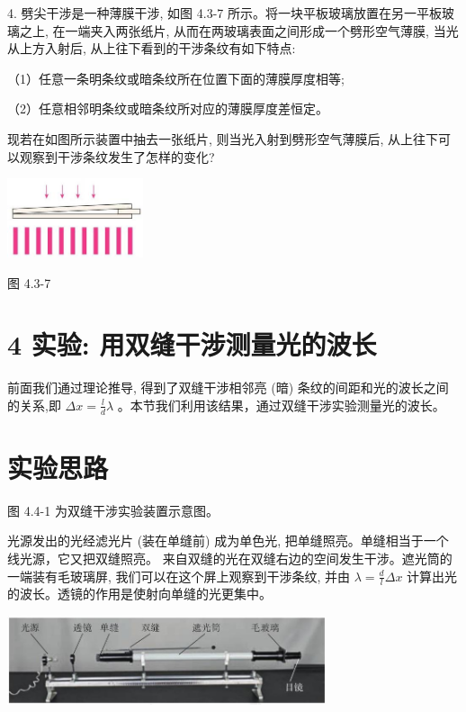 \documentclass[10pt]{article}
\begin{document}
4. 劈尖干涉是一种薄膜干涉, 如图 4.3-7 所示。将一块平板玻璃放置在另一平板玻璃之上, 在一端夹入两张纸片, 从而在两玻璃表面之间形成一个劈形空气薄膜, 当光从上方入射后, 从上往下看到的干涉条纹有如下特点:

（1）任意一条明条纹或暗条纹所在位置下面的薄膜厚度相等;

（2）任意相邻明条纹或暗条纹所对应的薄膜厚度差恒定。

现若在如图所示装置中抽去一张纸片, 则当光入射到劈形空气薄膜后, 从上往下可以观察到干涉条纹发生了怎样的变化?

\begin{center}
\includegraphics[max width=0.3\textwidth]{images/01910e4c-ebb8-7d2c-8f2f-2375bc1d2d12_105_471367.jpg}
\end{center}

图 4.3-7

\section*{4 实验: 用双缝干涉测量光的波长}

前面我们通过理论推导, 得到了双缝干涉相邻亮 (暗) 条纹的间距和光的波长之间的关系,即 \({\Delta x} = \frac{l}{d}\lambda\) 。本节我们利用该结果，通过双缝干涉实验测量光的波长。

\section*{实验思路}

图 4.4-1 为双缝干涉实验装置示意图。

光源发出的光经滤光片 (装在单缝前) 成为单色光, 把单缝照亮。单缝相当于一个线光源，它又把双缝照亮。 来自双缝的光在双缝右边的空间发生干涉。遮光筒的一端装有毛玻璃屏, 我们可以在这个屏上观察到干涉条纹, 并由 \(\lambda = \frac{d}{l}{\Delta x}\) 计算出光的波长。透镜的作用是使射向单缝的光更集中。

\begin{center}
\includegraphics[max width=0.7\textwidth]{images/01910e4c-ebb8-7d2c-8f2f-2375bc1d2d12_106_157676.jpg}
\end{center}
\end{document}
